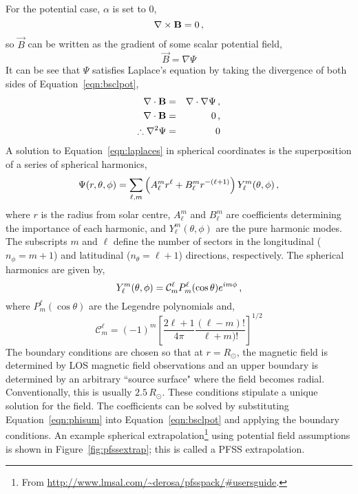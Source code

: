 For the potential case, $\alpha$ is set to 0, 
\begin{equation}\label{eqn:currfree}
\nabla \times \vec{B} = 0 \mbox{\,,}
\end{equation}
so $\vec{B}$ can be written as the gradient of some scalar potential field,
\begin{equation}
\vec{B} = \nabla \Psi   \label{eqn:bsclpot}
\end{equation}
It can be see that $\Psi$ satisfies Laplace's equation by taking the divergence of both sides of Equation~\ref{eqn:bsclpot},
\begin{eqnarray}
\nabla \cdot \vec{B} &=& \nabla \cdot \nabla \Psi \mbox{\,,} \\
\nabla \cdot \vec{B} &=& 0 \mbox{\,,} \\
\label{eqn:laplaces} \therefore \nabla^2 \Psi &=& 0  
\end{eqnarray}
A solution to Equation~\ref{eqn:laplaces} in spherical coordinates is the superposition of a series of spherical harmonics,
\begin{equation}\label{eqn:phisum}
\Psi(r,\theta,\phi) = \sum\limits_{\ell,m} \left( A_\ell^m r^\ell + B_\ell^m r^{-(\ell+1)}\right) Y^m_\ell(\theta,\phi) \mbox{\,,}
\end{equation}
where $r$  is the radius from solar centre, $A_\ell^m$ and $B_\ell^m$ are coefficients determining the importance of each harmonic, and $Y^m_\ell(\theta,\phi)$ are the pure harmonic modes. The subscripts $m$ and $\ell$ define the number of sectors in the longitudinal ($n_{\phi}=m+1$) and latitudinal ($n_{\theta}=\ell+1$) directions, respectively. The spherical harmonics are given by,
\begin{equation}
Y^m_\ell(\theta,\phi) = \mathcal{C}_m^\ell P_m^\ell(\cos{\theta}) e^{i m \phi} \mbox{\,,}
\end{equation}
where $P_m^\ell(\cos{\theta})$ are the Legendre polynomials and,
\begin{equation}
\mathcal{C}_m^\ell = (-1)^m \left[ \frac{2\ell+1}{4\pi} \frac{(\ell-m)!}{\ell+m)!} \right]^{1/2}  
\end{equation}
The boundary conditions are chosen so that at $r=R_{\odot}$, the magnetic field is determined by \gls{LOS} magnetic field observations and an upper boundary is determined by an arbitrary ``source surface" where the field becomes radial. Conventionally, this is usually $2.5\,R_{\odot}$. 
These conditions stipulate a unique solution for the field. The coefficients can be solved by substituting Equation~\ref{eqn:phisum} into Equation~\ref{eqn:bsclpot} and applying the boundary conditions. An example spherical extrapolation\footnote{From \url{http://www.lmsal.com/\~derosa/pfsspack/\#usersguide}.} using potential field assumptions is shown in Figure~\ref{fig:pfssextrap}; this is called a \gls{PFSS} extrapolation.

